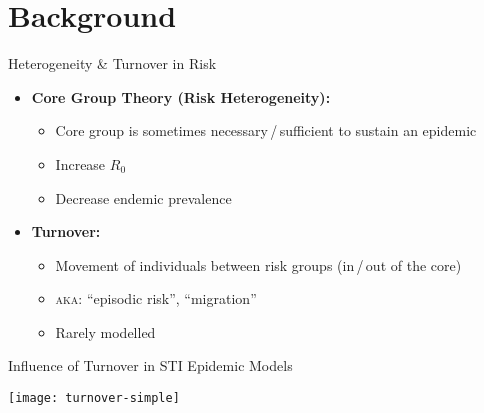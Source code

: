 \documentclass[11pt,aspectratio=169]{beamer}
\begin{document}
\section{Background}
\begin{frame}{Heterogeneity \& Turnover in Risk}
  \begin{itemize}
    \item \textbf{Core Group Theory (Risk Heterogeneity):}
    \begin{itemize}
      \item Core group is sometimes necessary\,/\,sufficient to sustain an epidemic
      \item Increase $R_0$
      \item Decrease endemic prevalence
    \end{itemize}
    \pause
    \item \textbf{Turnover:}
    \begin{itemize}
      \item Movement of individuals between risk groups (in\,/\,out of the core)
      \item \textsc{aka:} ``episodic risk'', ``migration''
      \item Rarely modelled
    \end{itemize}
  \end{itemize}
\end{frame}
\begin{frame}{Influence of Turnover in STI Epidemic Models}
  \begin{minipage}{0.62\linewidth}
    \begin{itemize}
    \end{itemize}
    \vspace*{3em}\footnotesize
  \end{minipage}%
  \begin{minipage}{0.38\linewidth}
    \texttt{[image: turnover-simple]}
  \end{minipage}
\end{frame}
\end{document}
